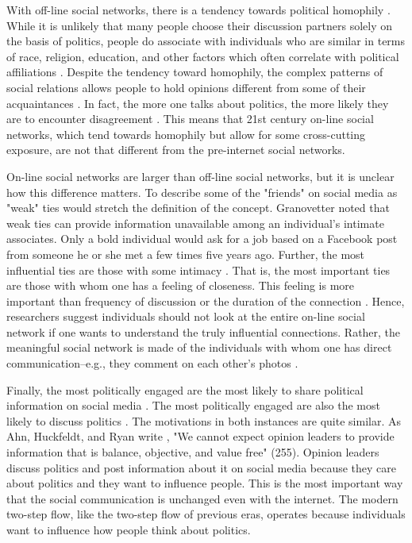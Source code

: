 \documentclass[12pt]{article}
\begin{document}
\begin{doublespace}
With off-line social networks, there is a tendency towards political homophily \citep{XXXX}.  While it is unlikely that many people choose their discussion partners solely on the basis of politics, people do associate with individuals who are similar in terms of race, religion, education, and other factors which often correlate with political affiliations \citep{McPhersonSmithLovinCook2001}. Despite the tendency toward homophily, the complex patterns of social relations allows people to hold opinions different from some of their acquaintances \citep{HuckfeldtJohnsonSprague2004}. In fact, the more one talks about politics, the more likely they are to encounter disagreement \citep{HuckfeldtMendez2008}. This means that 21st century on-line social networks, which tend towards homophily but allow for some cross-cutting exposure, are not that different from the pre-internet social networks.

On-line social networks are larger than off-line social networks, but it is unclear how this difference matters. To describe some of the "friends" on social media as "weak" ties would stretch the definition of the concept. Granovetter \citeyearpar{Granovetter1973} noted that weak ties can provide information unavailable among an individual's intimate associates. Only a bold individual would ask for a job based on a Facebook post from someone he or she met a few times five years ago. Further, the most influential ties are those with some intimacy \citep{Kenny1998}. That is, the most important ties are those with whom one has a feeling of closeness. This feeling is more important than frequency of discussion or the duration of the connection \citep{MarsdenCampbell1984}. Hence, researchers suggest individuals should not look at the entire on-line social network if one wants to understand the truly influential connections. Rather, the meaningful social network is made of the individuals with whom one has direct communication--e.g., they comment on each other's photos \citep{XXXX}.

Finally, the most politically engaged are the most likely to share political information on social media \citep{XXXX}. The most politically engaged are also the most likely to discuss politics \citep{Huckfeldt2001}. The motivations in both instances are quite similar. As Ahn, Huckfeldt, and Ryan write \citeyearpar{AhnHuckfeldtRyan2014}, "We cannot expect opinion leaders to provide information that is balance, objective, and value free" (255). Opinion leaders discuss politics and post information about it on social media because they care about politics and they want to influence people. This is the most important way that the social communication is unchanged even with the internet. The modern two-step flow, like the two-step flow of previous eras, operates because individuals want to influence how people think about politics.


\end{doublespace}
\end{document}
